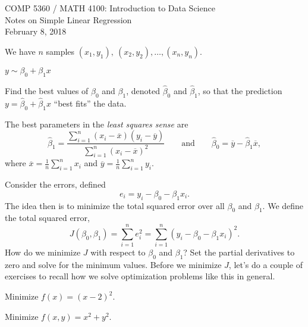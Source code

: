 \documentclass[letterpaper, 12pt]{amsart}
\begin{document}
\noindent COMP 5360 / MATH 4100:  Introduction to Data Science \\
Notes on Simple Linear Regression \\
February 8, 2018

\bigskip

 We have $n$ samples $(x_1, y_1), \ (x_2, y_2),\ldots,(x_n, y_n)$.

\bigskip

 $y \sim \beta_0 + \beta_1 x$ 

\bigskip

 Find the best values of $\beta_0$ and $\beta_1$, denoted $\hat{\beta}_0$ and $\hat{\beta}_1$, so that the prediction $y = \hat{\beta}_0 + \hat{\beta}_1 x$ ``best fits'' the data.

\bigskip

 The best parameters in the \emph{least squares sense} are
$$
\hat{\beta}_1 = \frac{ \sum_{i=1}^n (x_i - \overline{x})(y_i - \overline{y}) }{\sum_{i=1}^n (x_i - \overline{x})^2}
\qquad \textrm{and} \qquad
\hat{\beta}_0 = \overline{y} -  \hat{\beta}_1 \overline{x},  
$$
where $\overline{x} = \frac{1}{n} \sum_{i=1}^n x_i$ and $\overline{y} = \frac{1}{n} \sum_{i=1}^n y_i$. 

\bigskip

Consider the errors, defined
$$
e_i = y_i - \beta_0 - \beta_1 x_i .
$$
The idea then is to minimize the total squared error over all $\beta_0$ and $\beta_1$. We define the total squared error, 
$$
J(\beta_0, \beta_1) = \sum_{i=1}^n e_i^2  =   \sum_{i=1}^n (y_i - \beta_0 - \beta_1 x_i)^2. 
$$
How do we minimize $J$ with respect to $\beta_0$ and $\beta_1$? Set the partial derivatives to zero and solve for the minimum values. Before we minimize $J$, let's do a couple of exercises to recall how we solve optimization problems like this in general. 

\bigskip

 Minimize $f(x) = (x-2)^2$. 

\bigskip

 Minimize $f(x,y) = x^2 + y^2$. 

\bigskip
\end{document}
